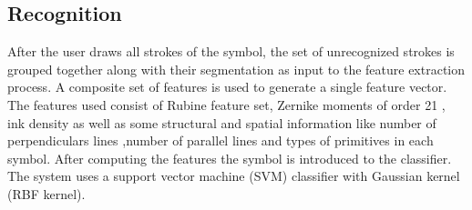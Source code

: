 \documentclass{article}%
\begin{document}
\subsection{Recognition}
After the user draws all strokes of the symbol, the set of unrecognized strokes is grouped together along with their segmentation as input to the feature extraction process. A composite set of features is used to generate a single feature vector. The features used consist of Rubine feature set,  Zernike moments of order 21 \cite{HeloiseBeautification}, ink density \cite{GeometryAndDomain102} as well as some structural and spatial information like number of perpendiculars lines ,number of parallel lines and types of primitives in each symbol. After computing the features the symbol is introduced to the classifier. The system uses a support vector machine (SVM) classifier with Gaussian kernel (RBF kernel).%
%
\end{document}
